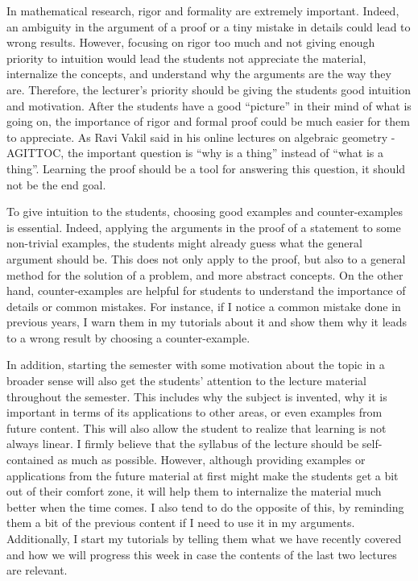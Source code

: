 \documentclass{article}
\begin{document}
\vspace{5mm}

\par In mathematical research, rigor and formality are extremely important. Indeed, an ambiguity in the argument of a proof or a tiny mistake in details could lead to wrong results. However, focusing on rigor too much and not giving enough priority to intuition would lead the students not appreciate the material, internalize the concepts, and understand why the arguments are the way they are. Therefore, the lecturer's priority should be giving the students good intuition and motivation. After the students have a good ``picture'' in their mind of what is going on, the importance of rigor and formal proof could be much easier for them to appreciate. As Ravi Vakil said in his online lectures on algebraic geometry - AGITTOC, the important question is ``why is a thing'' instead of ``what is a thing''. Learning the proof should be a tool for answering this question, it should not be the end goal.

\vspace{5mm}

\par To give intuition to the students, choosing good examples and counter-examples is essential. Indeed, applying the arguments in the proof of a statement to some non-trivial examples, the students might already guess what the general argument should be. This does not only apply to the proof, but also to a general method for the solution of a problem, and more abstract concepts. On the other hand, counter-examples are helpful for students to understand the importance of details or common mistakes. For instance, if I notice a common mistake done in previous years, I warn them in my tutorials about it and show them why it leads to a wrong result by choosing a counter-example. 

\vspace{5mm}

\par In addition, starting the semester with some motivation about the topic in a broader sense will also get the students' attention to the lecture material throughout the semester. This includes why the subject is invented, why it is important in terms of its applications to other areas, or even examples from future content. This will also allow the student to realize that learning is not always linear. I firmly believe that the syllabus of the lecture should be self-contained as much as possible. However, although providing examples or applications from the future material at first might make the students get a bit out of their comfort zone, it will help them to internalize the material much better when the time comes. I also tend to do the opposite of this, by reminding them a bit of the previous content if I need to use it in my arguments. Additionally, I start my tutorials by telling them what we have recently covered and how we will progress this week in case the contents of the last two lectures are relevant.
\end{document}
